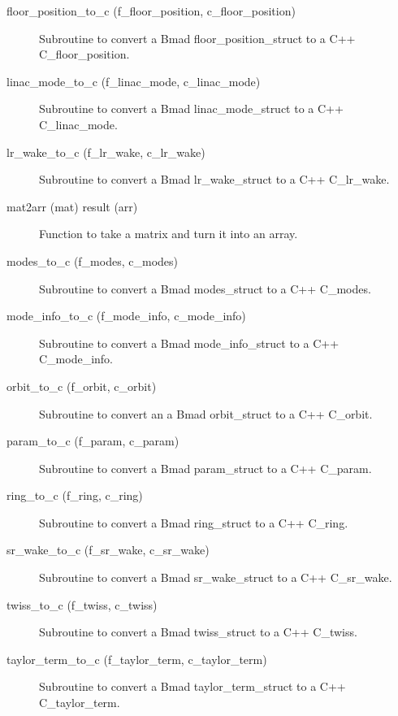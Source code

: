 \begin{description}
\item[floor\_position\_to\_c (f\_floor\_position, c\_floor\_position)] \Newline 
Subroutine to convert a Bmad floor\_position\_struct to a C++ C\_floor\_position.

\item[linac\_mode\_to\_c (f\_linac\_mode, c\_linac\_mode)] \Newline 
Subroutine to convert a Bmad linac\_mode\_struct to a C++ C\_linac\_mode.

\item[lr\_wake\_to\_c (f\_lr\_wake, c\_lr\_wake)] \Newline 
Subroutine to convert a Bmad lr\_wake\_struct to a C++ C\_lr\_wake.

\item[mat2arr (mat) result (arr)] \Newline 
Function to take a matrix and turn it into an array.

\item[modes\_to\_c (f\_modes, c\_modes)] \Newline 
Subroutine to convert a Bmad modes\_struct to a C++ C\_modes.

\item[mode\_info\_to\_c (f\_mode\_info, c\_mode\_info)] \Newline 
Subroutine to convert a Bmad mode\_info\_struct to a C++ C\_mode\_info.

\item[orbit\_to\_c (f\_orbit, c\_orbit)] \Newline 
Subroutine to convert an a Bmad orbit\_struct to a C++ C\_orbit.

\item[param\_to\_c (f\_param, c\_param)] \Newline 
Subroutine to convert a Bmad param\_struct to a C++ C\_param.

\item[ring\_to\_c (f\_ring, c\_ring)] \Newline 
Subroutine to convert a Bmad ring\_struct to a C++ C\_ring.

\item[sr\_wake\_to\_c (f\_sr\_wake, c\_sr\_wake)] \Newline 
Subroutine to convert a Bmad sr\_wake\_struct to a C++ C\_sr\_wake.

\item[twiss\_to\_c (f\_twiss, c\_twiss)] \Newline 
Subroutine to convert a Bmad twiss\_struct to a C++ C\_twiss.

\item[taylor\_term\_to\_c (f\_taylor\_term, c\_taylor\_term)] \Newline 
Subroutine to convert a Bmad taylor\_term\_struct to a C++ C\_taylor\_term.


\end{description}
